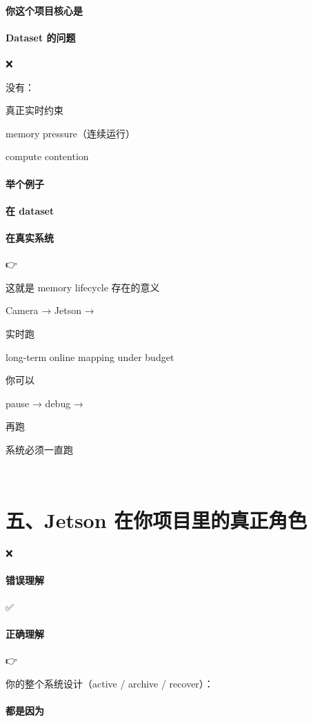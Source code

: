 \documentclass[12pt]{article}
\begin{document}
\paragraph{你这个项目核心是}
\paragraph{Dataset 的问题}
❌

没有：

真正实时约束

memory pressure（连续运行）

compute contention

\paragraph{举个例子}
\paragraph{在 dataset}
\paragraph{在真实系统}
👉

这就是 memory lifecycle 存在的意义

Camera → Jetson →

实时跑

long-term online mapping under budget

你可以

pause → debug →

再跑

系统必须⼀直跑

🧠

\section{五、Jetson 在你项目里的真正角色}
❌

\paragraph{错误理解}
✅

\paragraph{正确理解}
👉

你的整个系统设计（active / archive / recover）：

\paragraph{都是因为}
🎯
\end{document}
